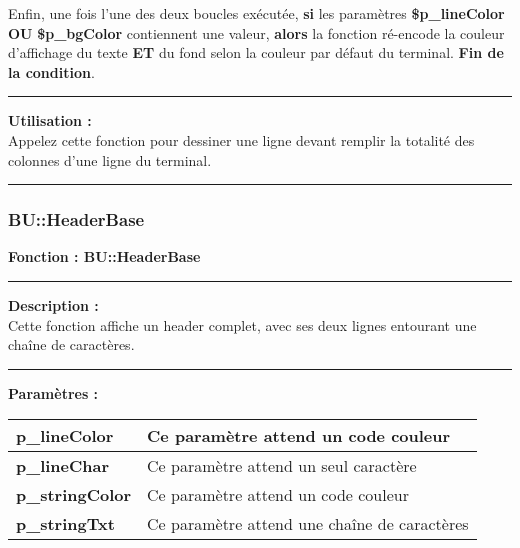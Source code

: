 \documentclass[a4paper,10pt]{article}
\begin{document}
\begin{justify}
    Enfin, une fois l'une des deux boucles exécutée, \textbf{\color{brick}si} les paramètres \textbf{\color{orange}\$p\_lineColor} \textbf{\color{brick}OU} \textbf{\color{orange}\$p\_bgColor} contiennent une valeur, \textbf{\color{brick}alors} la fonction ré-encode la couleur d'affichage du texte \textbf{ET} du fond selon la couleur par défaut du terminal. \textbf{\color{brick}Fin de la condition}.
\end{justify}

\par\noindent\rule{\textwidth}{0.4pt}

\begin{justify}
    \textbf{Utilisation :}\\
    Appelez cette fonction pour dessiner une ligne devant remplir la totalité des colonnes d'une ligne du terminal.
\end{justify}



\color{blue}\par\noindent\rule{\textwidth}{0.4pt}\color{white}

\color{blue}
\subsubsection{BU::HeaderBase}\color{white}

\textbf{Fonction : \color{mauve}BU::HeaderBase}\\

\par\noindent\rule{\textwidth}{0.4pt}

\begin{justify}
    \textbf{Description :}\\
    Cette fonction affiche un header complet, avec ses deux lignes entourant une chaîne de caractères.
\end{justify}


\par\noindent\rule{\textwidth}{0.4pt}

\textbf{Paramètres :}\\[1\baselineskip]
\begin{tabular}{|l|l|}
\hline 
\textbf{\color{orange}p\_lineColor} & Ce paramètre attend un code couleur \\ 
\hline 
\textbf{\color{orange}p\_lineChar} & Ce paramètre attend un seul caractère \\ 
\hline 
\textbf{\color{orange}p\_stringColor} & Ce paramètre attend un code couleur \\ 
\hline 
\textbf{\color{orange}p\_stringTxt} & Ce paramètre attend une chaîne de caractères\\ 
\hline 
\end{tabular}\\[1\baselineskip]
\end{document}
